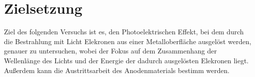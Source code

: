 \section{Zielsetzung}
\label{sec:Zielsetzung}

Ziel des folgenden Versuchs ist es, den Photoelektrischen Effekt, bei dem durch die Bestrahlung mit Licht Elekronen aus einer Metalloberfläche 
ausgelöst werden, genauer zu untersuchen, wobei der Fokus auf dem Zusammenhang der Wellenlänge des Lichts und der Energie der dadurch 
ausgelösten Elekronen liegt. Außerdem kann die Austrittsarbeit des Anodenmaterials bestimm werden. 
